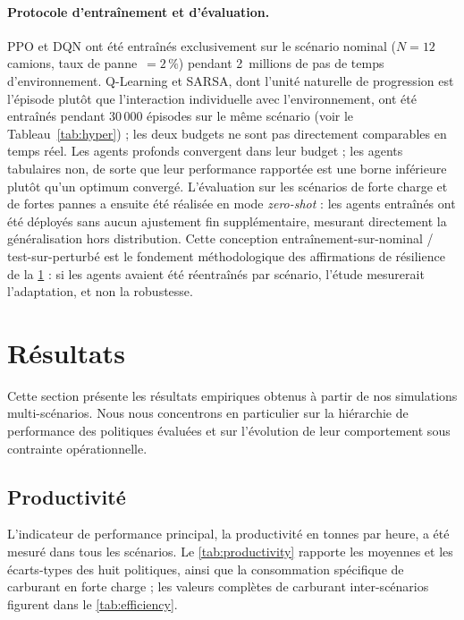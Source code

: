 \documentclass[11pt,a4paper]{article}
\begin{document}
\paragraph{Protocole d'entraînement et d'évaluation.}
PPO et DQN ont été entraînés exclusivement sur le scénario nominal ($N=12$ camions, taux de panne~$=2\,\%$) pendant 2~millions de pas de temps d'environnement. Q-Learning et SARSA, dont l'unité naturelle de progression est l'épisode plutôt que l'interaction individuelle avec l'environnement, ont été entraînés pendant 30\,000 épisodes sur le même scénario (voir le Tableau~\ref{tab:hyper}) ; les deux budgets ne sont pas directement comparables en temps réel. Les agents profonds convergent dans leur budget ; les agents tabulaires non, de sorte que leur performance rapportée est une borne inférieure plutôt qu'un optimum convergé. L'évaluation sur les scénarios de forte charge et de fortes pannes a ensuite été réalisée en mode \textit{zero-shot} : les agents entraînés ont été déployés sans aucun ajustement fin supplémentaire, mesurant directement la généralisation hors distribution. Cette conception entraînement-sur-nominal / test-sur-perturbé est le fondement méthodologique des affirmations de résilience de la \cref{sec:results} : si les agents avaient été réentraînés par scénario, l'étude mesurerait l'adaptation, et non la robustesse.
\section{Résultats}
\label{sec:results}

Cette section présente les résultats empiriques obtenus à partir de nos simulations multi-scénarios. Nous nous concentrons en particulier sur la hiérarchie de performance des politiques évaluées et sur l'évolution de leur comportement sous contrainte opérationnelle.

\subsection{Productivité}

L'indicateur de performance principal, la productivité en tonnes par heure, a été mesuré dans tous les scénarios. Le \cref{tab:productivity} rapporte les moyennes et les écarts-types des huit politiques, ainsi que la consommation spécifique de carburant en forte charge ; les valeurs complètes de carburant inter-scénarios figurent dans le \cref{tab:efficiency}.
\end{document}
